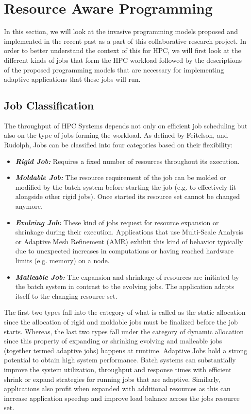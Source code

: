 \section{Resource Aware Programming}
In this section, we will look at the invasive programming models proposed and implemented in the recent past as a part of this collaborative research project. In order to better understand the context of this for HPC, we will first look at the different kinds of jobs that form the HPC workload followed by the descriptions of the proposed programming models that are necessary for implementing adaptive applications that these jobs will run.
\subsection{Job Classification}
The throughput of HPC Systems depends not only on efficient job scheduling but also on the type of jobs forming the workload. As defined by Feitelson, and Rudolph\cite{rudolph}, Jobs can be classified into four categories based on their flexibility:
\begin{itemize}
\item \textbf{\textit{Rigid Job:}} Requires a fixed number of resources throughout its execution.
\item \textbf{\textit{Moldable Job: }} The resource requirement of the job can be molded or modified by the batch system before starting the job (e.g. to effectively fit alongside other rigid jobs). Once started its resource set cannot be changed anymore.
\item \textbf{\textit{Evolving Job: }} These kind of jobs request for resource expansion or shrinkage during their execution. Applications that use Multi-Scale Analysis or Adaptive Mesh Refinement (AMR) exhibit this kind of behavior typically due to unexpected increases in computations or having reached hardware limits (e.g. memory) on a node.
\item \textbf{\textit{Malleable Job: }} The expansion and shrinkage of resources are initiated by the batch system in contrast to the evolving jobs. The application adapts itself to the changing resource set.
\end{itemize}
The first two types fall into the category of what is called as the static allocation since the allocation of rigid and moldable jobs must be finalized before the job starts. Whereas, the last two types fall under the category of dynamic allocation since this property of expanding or shrinking evolving and malleable jobs (together termed adaptive jobs) happens at runtime. Adaptive Jobs hold a strong potential to obtain high system performance. Batch systems can substantially improve the system utilization, throughput and response times with efficient shrink or expand strategies for running jobs that are adaptive. Similarly, applications also profit when expanded with additional resources as this can increase application speedup and improve load balance across the job\textquotesingle s resource set.
